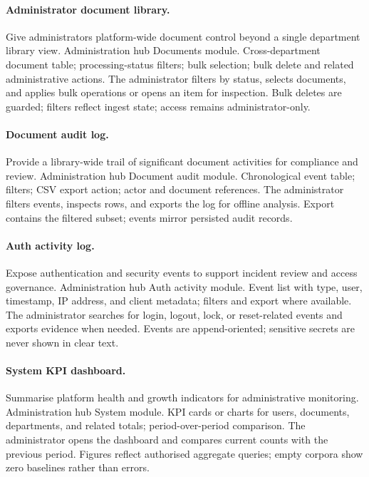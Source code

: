 \paragraph{Administrator document library.}
\uiexplain
{Give administrators platform-wide document control beyond a single department
library view.}
{Administration hub Documents module.}
{Cross-department document table; processing-status filters; bulk selection;
bulk delete and related administrative actions.}
{The administrator filters by status, selects documents, and applies bulk
operations or opens an item for inspection.}
{Bulk deletes are guarded; filters reflect ingest state; access remains
administrator-only.}

\paragraph{Document audit log.}
\uiexplain
{Provide a library-wide trail of significant document activities for compliance
and review.}
{Administration hub Document audit module.}
{Chronological event table; filters; CSV export action; actor and document
references.}
{The administrator filters events, inspects rows, and exports the log for
offline analysis.}
{Export contains the filtered subset; events mirror persisted audit records.}

\paragraph{Auth activity log.}
\uiexplain
{Expose authentication and security events to support incident review and
access governance.}
{Administration hub Auth activity module.}
{Event list with type, user, timestamp, IP address, and client metadata; filters
and export where available.}
{The administrator searches for login, logout, lock, or reset-related events and
exports evidence when needed.}
{Events are append-oriented; sensitive secrets are never shown in clear text.}

\paragraph{System KPI dashboard.}
\uiexplain
{Summarise platform health and growth indicators for administrative monitoring.}
{Administration hub System module.}
{KPI cards or charts for users, documents, departments, and related totals;
period-over-period comparison.}
{The administrator opens the dashboard and compares current counts with the
previous period.}
{Figures reflect authorised aggregate queries; empty corpora show zero baselines
rather than errors.}

